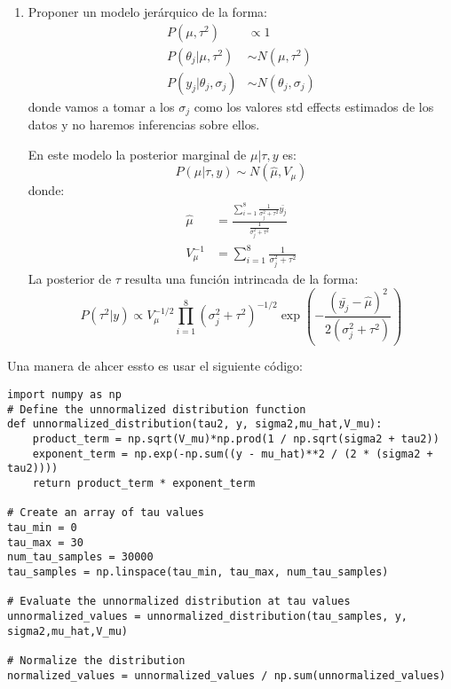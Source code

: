 \documentclass[12pt]{paper}
\begin{document}
\begin{enumerate}
\begin{enumerate}
\item Proponer un modelo jerárquico de la forma:
\begin{align*}
P(\mu,\tau^{2}) &\propto 1\\
P(\theta_{j}|\mu,\tau^{2}) &\sim N(\mu,\tau^{2})\\
P(y_{j}|\theta_{j},\sigma_{j}) &\sim N(\theta_{j},\sigma_{j})
\end{align*}
donde vamos a tomar a los $\sigma_{j}$ como los valores std effects estimados de los datos y no haremos inferencias sobre ellos.

En este modelo la posterior marginal de $\mu|\tau,y$ es:
\begin{equation}
P(\mu|\tau,y) \sim N(\hat{\mu},V_{\mu})
\end{equation}
donde:
\begin{align}
\hat{\mu} &= \frac{\sum_{i =1}^{8}\frac{1}{\sigma_{j}^{2}+ \tau^{2}}\bar{y_{j}}}{\frac{1}{\sigma_{j}^{2}+ \tau^{2}}} \\
V_{\mu}^{-1} &= \sum_{i=1}^{8}\frac{1}{\sigma_{j}^{2} + \tau^{2}}
\end{align}
La posterior de $\tau$ resulta una función intrincada de la forma:
\begin{equation}
P(\tau^{2}|y) \propto V_{\mu}^{-1/2} \prod_{i=1}^{8} (\sigma_{j}^{2}+ \tau^{2})^{-1/2} \exp \left(-\frac{(\bar{y_{j}} - \hat{\mu})^{2}}{2(\sigma^{2}_{j}+\tau^{2})}\right)
\end{equation}
\end{enumerate}



Una manera de ahcer essto es usar el siguiente código:

\begin{verbatim}
import numpy as np
# Define the unnormalized distribution function
def unnormalized_distribution(tau2, y, sigma2,mu_hat,V_mu):
    product_term = np.sqrt(V_mu)*np.prod(1 / np.sqrt(sigma2 + tau2))
    exponent_term = np.exp(-np.sum((y - mu_hat)**2 / (2 * (sigma2 + tau2))))
    return product_term * exponent_term

# Create an array of tau values
tau_min = 0
tau_max = 30
num_tau_samples = 30000
tau_samples = np.linspace(tau_min, tau_max, num_tau_samples)

# Evaluate the unnormalized distribution at tau values
unnormalized_values = unnormalized_distribution(tau_samples, y, sigma2,mu_hat,V_mu)

# Normalize the distribution
normalized_values = unnormalized_values / np.sum(unnormalized_values)


\end{verbatim}
\end{enumerate}
\end{document}
